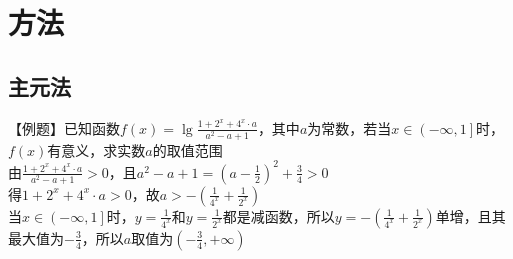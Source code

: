 \documentclass[UTF8]{ctexart}
\begin{document}
	\section{方法}
		\subsection{主元法}
			【例题】已知函数$f(x)=\lg \frac{1+2^x+4^x \cdot a}{a^2-a+1} $，其中$a$为常数，若当$x \in \left(-\infty ,1 \right] $时，$f(x)$有意义，求实数$a$的取值范围\\
			由$\frac{1+2^x+4^x \cdot a}{a^2-a+1}>0$，且$a^2-a+1=(a-\frac{1}{2})^2+\frac{3}{4}>0$\\
			得$1+2^x+4^x \cdot a>0$，故$a>-(\frac{1}{4^x}+\frac{1}{2^x})$\\
			当$x \in \left(-\infty ,1 \right] $时，$y=\frac{1}{4^x}$和$y=\frac{1}{2^x}$都是减函数，所以$y=-(\frac{1}{4^x}+\frac{1}{2^x})$单增，且其最大值为$-\frac{3}{4}$，所以$a$取值为$\left( -\frac{3}{4}, +\infty \right) $
\end{document}
